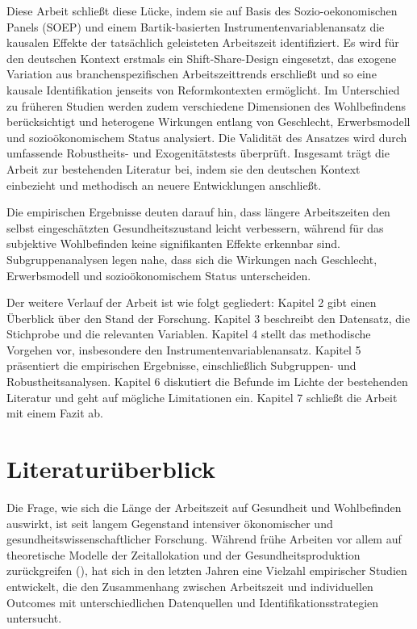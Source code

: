 \documentclass[12pt,a4paper]{article}
\begin{document}
Diese Arbeit schließt diese Lücke, indem sie auf Basis des Sozio-oekonomischen Panels (SOEP) und einem Bartik-basierten Instrumentenvariablenansatz \parencite{angrist2009, bartik1991} die kausalen Effekte der tatsächlich geleisteten Arbeitszeit identifiziert. Es wird für den deutschen Kontext erstmals ein Shift-Share-Design eingesetzt, das exogene Variation aus branchenspezifischen Arbeitszeittrends erschließt und so eine kausale Identifikation jenseits von Reformkontexten ermöglicht. Im Unterschied zu früheren Studien werden zudem verschiedene Dimensionen des Wohlbefindens berücksichtigt und heterogene Wirkungen entlang von Geschlecht, Erwerbsmodell und sozioökonomischem Status analysiert. Die Validität des Ansatzes wird durch umfassende Robustheits- und Exogenitätstests überprüft. Insgesamt trägt die Arbeit zur bestehenden Literatur bei, indem sie den deutschen Kontext einbezieht und methodisch an neuere Entwicklungen anschließt.

Die empirischen Ergebnisse deuten darauf hin, dass längere Arbeitszeiten den selbst eingeschätzten Gesundheitszustand leicht verbessern, während für das subjektive Wohlbefinden keine signifikanten Effekte erkennbar sind. Subgruppenanalysen legen nahe, dass sich die Wirkungen nach Geschlecht, Erwerbsmodell und sozioökonomischem Status unterscheiden.

Der weitere Verlauf der Arbeit ist wie folgt gegliedert: Kapitel 2 gibt einen Überblick über den Stand der Forschung. Kapitel 3 beschreibt den Datensatz, die Stichprobe und die relevanten Variablen. Kapitel 4 stellt das methodische Vorgehen vor, insbesondere den Instrumentenvariablenansatz. Kapitel 5 präsentiert die empirischen Ergebnisse, einschließlich Subgruppen- und Robustheitsanalysen. Kapitel 6 diskutiert die Befunde im Lichte der bestehenden Literatur und geht auf mögliche Limitationen ein. Kapitel 7 schließt die Arbeit mit einem Fazit ab.



\section{Literaturüberblick}
Die Frage, wie sich die Länge der Arbeitszeit auf Gesundheit und Wohlbefinden auswirkt, ist seit langem Gegenstand intensiver ökonomischer und gesundheitswissenschaftlicher Forschung. Während frühe Arbeiten vor allem auf theoretische Modelle der Zeitallokation und der Gesundheitsproduktion zurückgreifen (\cite{becker1965,grossman1972}), hat sich in den letzten Jahren eine Vielzahl empirischer Studien entwickelt, die den Zusammenhang zwischen Arbeitszeit und individuellen Outcomes mit unterschiedlichen Datenquellen und Identifikationsstrategien untersucht. 
\end{document}
